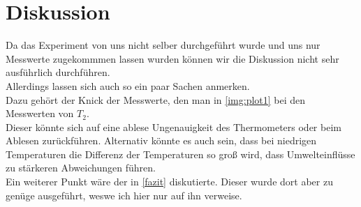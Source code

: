 \section{Diskussion}
Da das Experiment von uns nicht selber durchgeführt wurde und uns nur Messwerte zugekommmen
lassen wurden können wir die Diskussion nicht sehr ausführlich durchführen.\\
Allerdings lassen sich auch so ein paar Sachen anmerken.\\
Dazu gehört der Knick der Messwerte, den man in \ref{img:plot1} bei den Messwerten von $T_2$.\\
Dieser könnte sich auf eine ablese Ungenauigkeit des Thermometers oder beim Ablesen zurückführen.
Alternativ könnte es auch sein, dass bei niedrigen Temperaturen die Differenz der Temperaturen so groß wird, dass 
Umwelteinflüsse zu stärkeren Abweichungen führen.\\
Ein weiterer Punkt wäre der in \ref{fazit} diskutierte. Dieser wurde dort aber zu genüge ausgeführt, weswe ich hier nur auf ihn verweise.